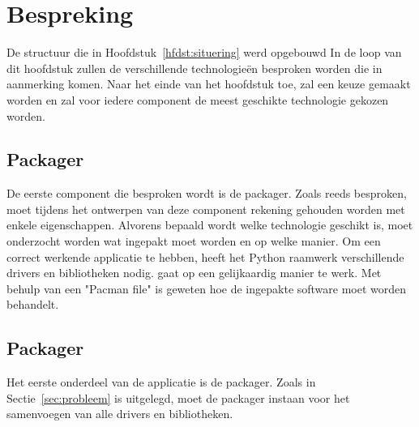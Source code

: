 \chapter{Bespreking}
De structuur die in Hoofdstuk~\ref{hfdst:situering} werd opgebouwd
In de loop van dit hoofdstuk zullen de verschillende technologieën besproken worden die in aanmerking komen.
Naar het einde van het hoofdstuk toe, zal een keuze gemaakt worden en zal voor iedere component de meest geschikte technologie gekozen worden.

\section{Packager}
De eerste component die besproken wordt is de packager.
Zoals reeds besproken, moet tijdens het ontwerpen van deze component rekening gehouden worden met enkele eigenschappen.
Alvorens bepaald wordt welke technologie geschikt is, moet onderzocht worden wat ingepakt moet worden en op welke manier.
Om een correct werkende applicatie te hebben, heeft het Python raamwerk verschillende drivers en bibliotheken nodig.
\citep{packAtlas} gaat op een gelijkaardig manier te werk. 
Met behulp van een "Pacman file" is geweten hoe de ingepakte software moet worden behandelt.


%  

\section{Packager}
Het eerste onderdeel van de applicatie is de packager.
Zoals in Sectie~\ref{sec:probleem} is uitgelegd, moet de packager instaan voor het samenvoegen van alle drivers en bibliotheken.
%
%

